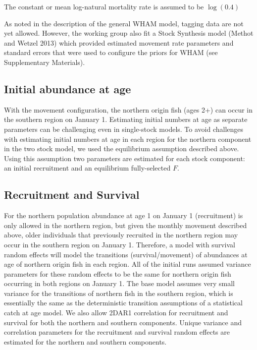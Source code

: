 \documentclass[
]{article}
\begin{document}
The constant or mean log-natural mortality rate is assumed to be
\(\log(0.4)\)

As noted in the description of the general WHAM model, tagging data are
not yet allowed. However, the working group also fit a Stock Synthesis
model (Methot and Wetzel 2013) which provided estimated movement rate
parameters and standard errors that were used to configure the priors
for WHAM (see Supplementary Materials).

\hypertarget{initial-abundance-at-age}{%
\subsection*{Initial abundance at age}\label{initial-abundance-at-age}}

With the movement configuration, the northern origin fish (ages 2+) can
occur in the southern region on January 1. Estimating initial numbers at
age as separate parameters can be challenging even in single-stock
models. To avoid challenges with estimating initial numbers at age in
each region for the northern component in the two stock model, we used
the equilibrium assumption described above. Using this assumption two
parameters are estimated for each stock component: an initial
recruitment and an equilibrium fully-selected \(F\).

\hypertarget{recruitment-and-survival}{%
\subsection*{Recruitment and Survival}\label{recruitment-and-survival}}

For the northern population abundance at age 1 on January 1
(recruitment) is only allowed in the northern region, but given the
monthly movement described above, older individuals that previously
recruited in the northern region may occur in the southern region on
January 1. Therefore, a model with survival random effects will model
the transitions (survival/movement) of abundances at age of northern
origin fish in each region. All of the initial runs assumed variance
parameters for these random effects to be the same for northern origin
fish occurring in both regions on January 1. The base model assumes very
small variance for the transitions of northern fish in the southern
region, which is essentially the same as the deterministic transition
assumptions of a statistical catch at age model. We also allow 2DAR1
correlation for recruitment and survival for both the northern and
southern components. Unique variance and correlation parameters for the
recruitment and survival random effects are estimated for the northern
and southern components.
\end{document}

